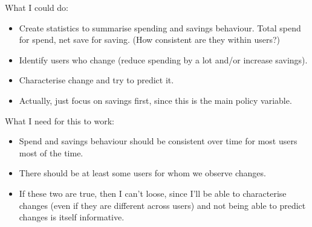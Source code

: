 What I could do:

\begin{itemize}
    \item Create statistics to summarise spending and savings behaviour. Total
        spend for spend, net save for saving. (How consistent are they within
        users?)

    \item Identify users who change (reduce spending by a lot and/or increase
        savings).

    \item Characterise change and try to predict it.

    \item Actually, just focus on savings first, since this is the main policy
        variable.
\end{itemize}

What I need for this to work:
\begin{itemize}
    \item Spend and savings behaviour should be consistent over time for most
        users most of the time.

    \item There should be at least some users for whom we observe changes.

    \item If these two are true, then I can't loose, since I'll be able to
        characterise changes (even if they are different across users) and not
        being able to predict changes is itself informative.
\end{itemize}
